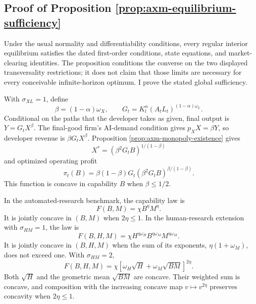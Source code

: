 \subsection{Proof of Proposition \ref{prop:axm-equilibrium-sufficiency}}

Under the usual normality and differentiability conditions, every regular
interior equilibrium satisfies the dated first-order conditions, state equations,
and market-clearing identities. The proposition conditions the converse on the
two displayed transversality restrictions; it does not claim that those limits
are necessary for every conceivable infinite-horizon optimum. I prove the stated
global sufficiency.

With \(\sigma_{XL}=1\), define
\[
 \beta=(1-\alpha)\omega_X,
 \qquad G_t=K_t^\alpha(A_tL_t)^{(1-\alpha)\omega_L}.
\]
Conditional on the paths that the developer takes as given, final output is
\(Y=G_tX^\beta\). The final-good firm's AI-demand condition gives
\(p_XX=\beta Y\), so developer revenue is \(\beta G_tX^\beta\). Proposition
\ref{prop:axm-monopoly-existence} gives
\[
 X^*=(\beta^2G_tB)^{1/(1-\beta)}
\]
and optimized operating profit
\[
 \pi_t(B)=\beta(1-\beta)G_t
 (\beta^2G_tB)^{\beta/(1-\beta)}.
\]
This function is concave in capability \(B\) when \(\beta\leq1/2\).

In the automated-research benchmark, the capability law is
\[
 F(B,M)=\chi B^\eta M^\eta.
\]
It is jointly concave in \((B,M)\) when \(2\eta\leq1\). In the human-research
extension with \(\sigma_{HM}=1\), the law is
\[
 F(B,H,M)=\chi H^{\eta\omega_H}
 B^{\eta\omega_M}M^{\eta\omega_M}.
\]
It is jointly concave in \((B,H,M)\) when the sum of its exponents,
\(\eta(1+\omega_M)\), does not exceed one. With \(\sigma_{HM}=2\),
\[
 F(B,H,M)=\chi\left[\omega_H\sqrt H+
 \omega_M\sqrt{BM}\right]^{2\eta}.
\]
Both \(\sqrt H\) and the geometric mean \(\sqrt{BM}\) are concave. Their
weighted sum is concave, and composition with the increasing concave map
\(v\mapsto v^{2\eta}\) preserves concavity when \(2\eta\leq1\).

